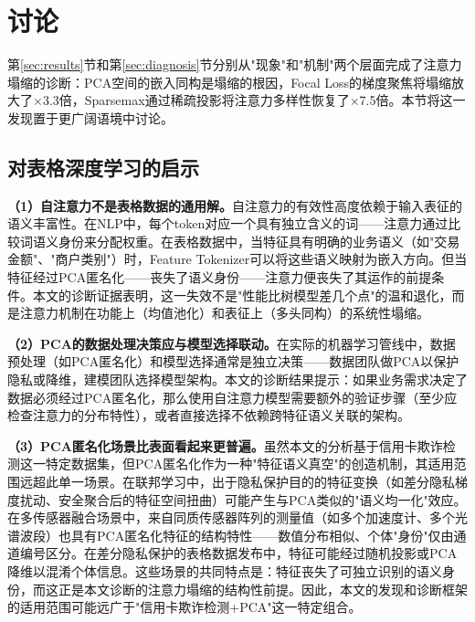 
\section{讨论}
\label{sec:discussion}

第\ref{sec:results}节和第\ref{sec:diagnosis}节分别从"现象"和"机制"两个层面完成了注意力塌缩的诊断：PCA空间的嵌入同构是塌缩的根因，Focal Loss的梯度聚焦将塌缩放大了$\times$3.3倍，Sparsemax通过稀疏投影将注意力多样性恢复了$\times$7.5倍。本节将这一发现置于更广阔语境中讨论。

\subsection{对表格深度学习的启示}

\textbf{（1）自注意力不是表格数据的通用解。}自注意力的有效性高度依赖于输入表征的语义丰富性。在NLP中，每个token对应一个具有独立含义的词——注意力通过比较词语义身份来分配权重。在表格数据中，当特征具有明确的业务语义（如"交易金额"、"商户类别"）时，Feature Tokenizer可以将这些语义映射为嵌入方向。但当特征经过PCA匿名化——丧失了语义身份——注意力便丧失了其运作的前提条件。本文的诊断证据表明，这一失效不是"性能比树模型差几个点"的温和退化，而是注意力机制在功能上（均值池化）和表征上（多头同构）的系统性塌缩。

\textbf{（2）PCA的数据处理决策应与模型选择联动。}在实际的机器学习管线中，数据预处理（如PCA匿名化）和模型选择通常是独立决策——数据团队做PCA以保护隐私或降维，建模团队选择模型架构。本文的诊断结果提示：如果业务需求决定了数据必须经过PCA匿名化，那么使用自注意力模型需要额外的验证步骤（至少应检查注意力的分布特性），或者直接选择不依赖跨特征语义关联的架构。

\textbf{（3）PCA匿名化场景比表面看起来更普遍。}虽然本文的分析基于信用卡欺诈检测这一特定数据集，但PCA匿名化作为一种"特征语义真空"的创造机制，其适用范围远超此单一场景。在联邦学习中，出于隐私保护目的的特征变换（如差分隐私梯度扰动、安全聚合后的特征空间扭曲）可能产生与PCA类似的"语义均一化"效应。在多传感器融合场景中，来自同质传感器阵列的测量值（如多个加速度计、多个光谱波段）也具有PCA匿名化特征的结构特性——数值分布相似、个体"身份"仅由通道编号区分。在差分隐私保护的表格数据发布中，特征可能经过随机投影或PCA降维以混淆个体信息。这些场景的共同特点是：特征丧失了可独立识别的语义身份，而这正是本文诊断的注意力塌缩的结构性前提。因此，本文的发现和诊断框架的适用范围可能远广于"信用卡欺诈检测+PCA"这一特定组合。

